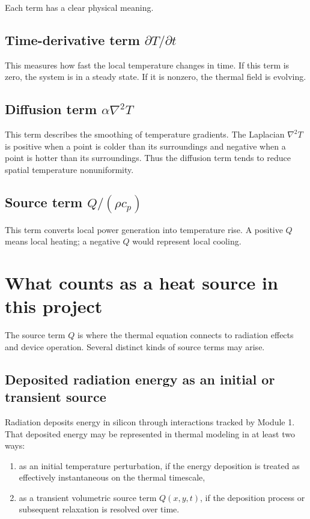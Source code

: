 \documentclass[11pt]{article}
\begin{document}
Each term has a clear physical meaning.

\subsection{Time-derivative term $\partial T/\partial t$}

This measures how fast the local temperature changes in time. If this term is zero, the system is in a steady state. If it is nonzero, the thermal field is evolving.

\subsection{Diffusion term $\alpha \nabla^2 T$}

This term describes the smoothing of temperature gradients. The Laplacian $\nabla^2 T$ is positive when a point is colder than its surroundings and negative when a point is hotter than its surroundings. Thus the diffusion term tends to reduce spatial temperature nonuniformity.

\subsection{Source term $Q/(\rho c_p)$}

This term converts local power generation into temperature rise. A positive $Q$ means local heating; a negative $Q$ would represent local cooling.

\section{What counts as a heat source in this project}

The source term $Q$ is where the thermal equation connects to radiation effects and device operation. Several distinct kinds of source terms may arise.

\subsection{Deposited radiation energy as an initial or transient source}

Radiation deposits energy in silicon through interactions tracked by Module 1. That deposited energy may be represented in thermal modeling in at least two ways:
\begin{enumerate}[label=\arabic*.]
    \item as an initial temperature perturbation, if the energy deposition is treated as effectively instantaneous on the thermal timescale,
    \item as a transient volumetric source term $Q(x,y,t)$, if the deposition process or subsequent relaxation is resolved over time.
\end{enumerate}
\end{document}
